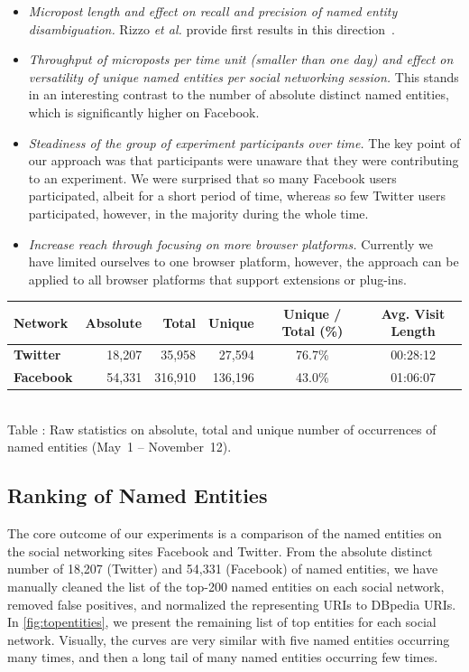\documentclass{iosart2c}
\newcommand{\tablecaption}[1]{%
  \\[1em]%
  \refstepcounter{table}%
  Table \arabic{table}: #1%
}
\begin{document}
\begin{itemize}
\item \emph{Micropost length and effect on recall and precision of named entity disambiguation.}
Rizzo \textit{et al.} provide first results in this direction~\cite{nerd}.
\item \emph{Throughput of microposts per time unit (smaller than one day) and effect on versatility of unique named entities per social networking session.}
This stands in an interesting contrast to the number of absolute distinct named entities, which is significantly higher on Facebook.
\item \emph{Steadiness of the group of experiment participants over time.}
The key point of our approach was that participants were unaware that they were contributing to an experiment.
We were surprised that so many Facebook users participated, albeit for a short period of time, whereas so few Twitter users participated, however, in the majority during the whole time.
\item \emph{Increase reach through focusing on more browser platforms.}
Currently we have limited ourselves to one browser platform, however, the approach can be applied to all browser platforms that support extensions or plug-ins.
\end{itemize}

\begin{table}
  \centering
    \begin{tabular}{|l | r | r | r | c | c |}
    \hline
    \textbf{Network} &
	\textbf{Absolute} & \textbf{Total} & \textbf{Unique} & \textbf{Unique / Total (\%)} & \textbf{Avg. Visit Length} \\ \hline
	\textbf{Twitter} &
	18,207 & 35,958 & 27,594 & 76.7\% & 00:28:12 \\
    \hline
    \textbf{Facebook} &
	54,331 & 316,910 	& 136,196 & 43.0\% & 01:06:07 \\ 
    \hline
  \end{tabular}
  \tablecaption{Raw statistics on absolute, total and unique number of occurrences of named entities (May~1 -- November~12).}
  \label{tbl:raw}
\end{table}

\subsection{Ranking of Named Entities}
The core outcome of our experiments is a comparison of the named entities on the social networking sites Facebook and Twitter.
From the absolute distinct number of 18,207 (Twitter) and 54,331 (Facebook) of named entities, we have manually cleaned the list of the top-200 named entities on each social network, removed false positives, and normalized the representing URIs to DBpedia URIs.
In \autoref{fig:topentities}, we present the remaining list of top entities for each social network.
Visually, the curves are very similar with five named entities occurring many times, and then a long tail of many named entities occurring few times.
\end{document}

